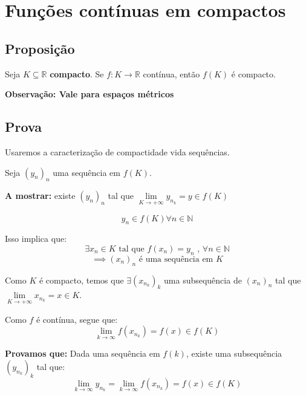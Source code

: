 \documentclass[12pt]{article}
\begin{document}
    \section*{Funções contínuas em compactos}
    \subsection*{Proposição}
     Seja $K \subseteq \mathbb{R}$ \textbf{compacto}. Se $f: K \to \mathbb{R}$ contínua, então $f(K)$ é compacto. 
     
     \textbf{Observação: Vale para espaços métricos}

    \subsection*{Prova}
     Usaremos a caracterização de compactidade vida sequências. 
     
     Seja $(y_n)_n$ uma sequência em $f(K)$.
     
     \textbf{A mostrar: } existe $(y_n)_n$ tal que $\lim \limits_{K \to + \infty} y_{n_k} = y \in f(K)$

    \begin{equation*}
        y_n \in f(K) \forall n \in \mathbb{N}
    \end{equation*}

    Isso implica que:
    \begin{equation*}
        \exists x_n \in K \text{ tal que } f(x_n) = y_n \text{ , } \forall n \in \mathbb{N}
    \end{equation*}
    \begin{equation*}
        \implies (x_n)_n \text{ é uma sequência em } K
    \end{equation*}

    Como $K$ é compacto, temos que $\exists (x_{n_k})_k$ uma subsequência de $(x_n)_n$ tal que $\lim \limits_{K \to + \infty} x_{n_k} = x \in K$.

    Como $f$ é contínua, segue que:
    \begin{equation*}
        \lim \limits_{k \to \infty} f(x_{n_k}) = f(x) \in f(K)
    \end{equation*}

    \textbf{Provamos que: } Dada uma sequência em $f(k)$, existe uma subsequência $(y_{n_k})_k$ tal que:
    \begin{equation*}
        \lim \limits_{k \to \infty} y_{n_k} = \lim \limits_{k \to \infty} f(x_{n_k}) = f(x) \in f(K)
    \end{equation*}
\end{document}
